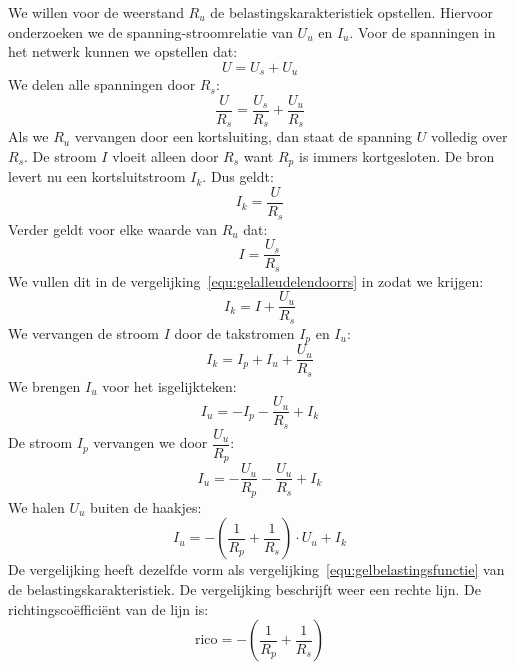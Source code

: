 We willen voor de weerstand $R_u$ de belastingskarakteristiek opstellen. Hiervoor onderzoeken we de
spanning-stroomrelatie van $U_u$ en $I_u$.
%
Voor de spanningen in het netwerk kunnen we opstellen dat:
%
\begin{equation}
U = U_s + U_u
\end{equation}
%
We delen alle spanningen door $R_s$:
%
\begin{equation}
\label{equ:gelalleudelendoorrs}
\dfrac{U}{R_s} = \dfrac{U_s}{R_s} + \dfrac{U_u}{R_s}
\end{equation}
%
Als we $R_u$ vervangen door een kortsluiting, dan staat de spanning $U$ volledig over $R_s$. De stroom $I$ 
vloeit alleen door $R_s$ want $R_p$ is immers kortgesloten. De bron levert nu een kortsluitstroom $I_k$.
Dus geldt:
%
\begin{equation}
\label{equ:theveninkortsluitstroom}
I_k = \dfrac{U}{R_s}
\end{equation}
%
Verder geldt voor elke waarde van $R_u$ dat:
\begin{equation}
I = \dfrac{U_s}{R_s}
\end{equation}
%
We vullen dit in de vergelijking~\eqref{equ:gelalleudelendoorrs} in zodat we krijgen:
% 
\begin{equation}
I_k = I + \dfrac{U_u}{R_s}
\end{equation}
%
We vervangen de stroom $I$ door de takstromen $I_p$ en $I_u$:
%
\begin{equation}
I_k = I_p + I_u + \dfrac{U_u}{R_s}
\end{equation}
%
We brengen $I_u$ voor het isgelijkteken:
%
\begin{equation}
I_u = -I_p - \dfrac{U_u}{R_s} + I_k
\end{equation}
%
De stroom $I_p$ vervangen we door $\dfrac{U_u}{R_p}$:
%
\begin{equation}
I_u = -\dfrac{U_u}{R_p} - \dfrac{U_u}{R_s} + I_k
\end{equation}
%
We halen $U_u$ buiten de haakjes:
%
\begin{equation}
I_u = - \left(\dfrac{1}{R_p}+\dfrac{1}{R_s}\right)\cdot U_u + I_k
\end{equation}
%
De vergelijking heeft dezelfde vorm als vergelijking~\eqref{equ:gelbelastingsfunctie} van de belastingskarakteristiek.
De vergelijking beschrijft weer een rechte lijn. De richtingsco\"effici\"ent van de lijn is:
%
\begin{equation}
\text{rico} = - \left(\dfrac{1}{R_p}+\dfrac{1}{R_s}\right)
\end{equation}
